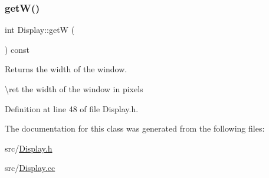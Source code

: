 \begin{DoxyCode}{0}

\end{DoxyCode}
\mbox{\label{class_display_a246593e6e7d4e634e9c638525e103b6e}} 
\subsubsection{\texorpdfstring{getW()}{getW()}}
{\footnotesize\ttfamily int Display\+::getW (\begin{DoxyParamCaption}{ }\end{DoxyParamCaption}) const\hspace{0.3cm}{\ttfamily [inline]}}



Returns the width of the window. 

\textbackslash{}ret the width of the window in pixels 

Definition at line 48 of file Display.\+h.


\begin{DoxyCode}{0}

\end{DoxyCode}


The documentation for this class was generated from the following files\+:\begin{DoxyCompactItemize}
\item 
src/\mbox{\hyperlink{_display_8h}{Display.\+h}}\item 
src/\mbox{\hyperlink{_display_8cc}{Display.\+cc}}\end{DoxyCompactItemize}
